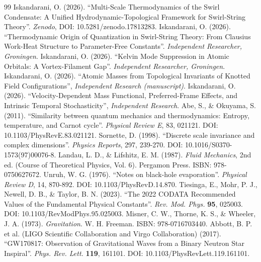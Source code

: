 \documentclass[11pt, a4paper]{article}
\begin{document}
        \begin{thebibliography}{99}
            Iskandarani, O. (2026). ``Multi-Scale Thermodynamics of the Swirl Condensate: A Unified Hydrodynamic-Topological Framework for Swirl-String Theory''. \textit{Zenodo}, DOI: 10.5281/zenodo.17813283.
            Iskandarani, O. (2026). ``Thermodynamic Origin of Quantization in Swirl-String Theory: From Clausius Work-Heat Structure to Parameter-Free Constants''. \textit{Independent Researcher, Groningen}.
            Iskandarani, O. (2026). ``Kelvin Mode Suppression in Atomic Orbitals: A Vortex-Filament Gap''. \textit{Independent Researcher, Groningen}.
            Iskandarani, O. (2026). ``Atomic Masses from Topological Invariants of Knotted Field Configurations'', \textit{Independent Research (manuscript)}.
            Iskandarani, O. (2026). ``Velocity-Dependent Mass Functional, Preferred-Frame Effects, and Intrinsic Temporal Stochasticity'', \textit{Independent Research}.
            Abe, S., \& Okuyama, S. (2011). ``Similarity between quantum mechanics and thermodynamics: Entropy, temperature, and Carnot cycle''. \textit{Physical Review E}, 83, 021121. DOI: 10.1103/PhysRevE.83.021121.
            Sornette, D. (1998). ``Discrete scale invariance and complex dimensions''. \textit{Physics Reports}, 297, 239-270. DOI: 10.1016/S0370-1573(97)00076-8.
            Landau, L. D., \& Lifshitz, E. M. (1987). \textit{Fluid Mechanics}, 2nd ed. (Course of Theoretical Physics, Vol. 6). Pergamon Press. ISBN: 978-0750627672.
            Unruh, W. G. (1976). ``Notes on black-hole evaporation''. \textit{Physical Review D}, 14, 870-892. DOI: 10.1103/PhysRevD.14.870.
            Tiesinga, E., Mohr, P. J., Newell, D. B., \& Taylor, B. N. (2023). ``The 2022 CODATA Recommended Values of the Fundamental Physical Constants''. \textit{Rev. Mod. Phys.} \textbf{95}, 025003. DOI: 10.1103/RevModPhys.95.025003.
            Misner, C. W., Thorne, K. S., \& Wheeler, J. A. (1973). \textit{Gravitation}. W. H. Freeman. ISBN: 978-0716703440.
            Abbott, B. P. et al. (LIGO Scientific Collaboration and Virgo Collaboration) (2017). ``GW170817: Observation of Gravitational Waves from a Binary Neutron Star Inspiral''. \textit{Phys. Rev. Lett.} \textbf{119}, 161101. DOI: 10.1103/PhysRevLett.119.161101.
        \end{thebibliography}
    
    
\end{document}
